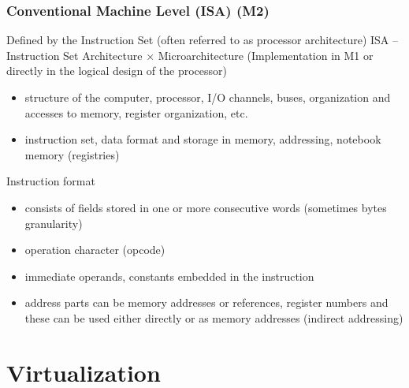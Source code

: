 \documentclass{beamer}
\begin{document}
\begin{frame}
\frametitle{Conventional Machine Level (ISA) (M2)}

Defined by the Instruction Set (often referred to as processor architecture) ISA -- Instruction Set Architecture $\times$ Microarchitecture (Implementation in M1 or directly in the logical design of the processor)

\begin{itemize}
 \item structure of the computer, processor, I/O channels, buses, organization and accesses to memory, register organization, etc.
 \item instruction set, data format and storage in memory, addressing, notebook memory (registries)
\end{itemize}

Instruction format

\begin{itemize}
 \item consists of fields stored in one or more consecutive words (sometimes bytes granularity)
 \item operation character (opcode)
 \item immediate operands, constants embedded in the instruction
 \item address parts can be memory addresses or references, register numbers and these can be used either directly or as memory addresses (indirect addressing)
\end{itemize}
\end{frame}

\section{Virtualization}
\end{document}

